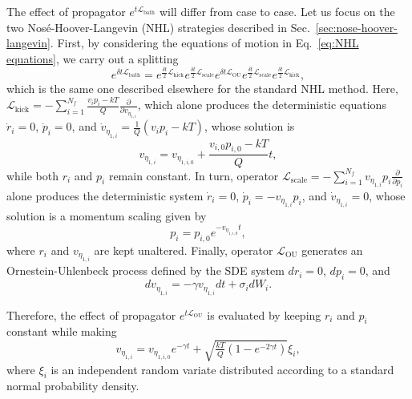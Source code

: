 \documentclass[
aip,
jcp,
reprint,
]{revtex4-1}
\newcommand{\diff}[2]{\frac{\partial #2}{\partial #1}} %
\newcommand{\Liu}{\mathcal{L}}
\begin{document}
The effect of propagator $e^{t \Liu_\mathrm{bath}}$ will differ from case to case.
Let us focus on the two Nos\'{e}-Hoover-Langevin (NHL) strategies described in Sec.~\ref{sec:nose-hoover-langevin}.
First, by considering the equations of motion in Eq.~\eqref{eq:NHL equations}, we carry out a splitting
\begin{equation*}
e^{\delta t \Liu_\mathrm{bath}} = e^{\frac{\delta t}{2} \mathcal{L}_\mathrm{kick}} e^{\frac{\delta t}{2} \mathcal{L}_\mathrm{scale}} e^{\delta t \mathcal{L}_\mathrm{OU}} e^{\frac{\delta t}{2} \mathcal{L}_\mathrm{scale}} e^{\frac{\delta t}{2} \mathcal{L}_\mathrm{kick}},
\end{equation*}
which is the same one described elsewhere \cite{Leimkuhler_2015} for the standard NHL method.
Here, $\mathcal{L}_\mathrm{kick} = - \sum_{i=1}^{N_f} \frac{v_i p_i - kT}{Q} \diff{v_{\eta_{1,i}}}{}$, which alone produces the deterministic equations $\dot{r}_i = 0$, $\dot{p}_i = 0$, and $\dot{v}_{\eta_{1,i}} = \frac{1}{Q}(v_i p_i - kT)$, whose solution is
\begin{equation*}
v_{\eta_{1,i}} = v_{\eta_{1,i,0}} + \frac{v_{i,0} p_{i,0} - kT}{Q} t,
\end{equation*}
while both $r_i$ and $p_i$ remain constant.
In turn, operator $\mathcal{L}_\mathrm{scale} = - \sum_{i=1}^{N_f} v_{\eta_{1,i}} p_i \diff{p_i}{}$ alone produces the deterministic system $\dot{r}_i = 0$, $\dot{p}_i = - v_{\eta_{1,i}} p_i$, and $\dot{v}_{\eta_{1,i}} = 0$, whose solution is a momentum scaling given by
\begin{equation*}
p_i = p_{i,0} e^{-v_{\eta_{1,i,0}} t},
\end{equation*}
where $r_i$ and $v_{\eta_{1,i}}$ are kept unaltered.
Finally, operator $\mathcal{L}_\mathrm{OU}$ generates an Ornestein-Uhlenbeck process defined by the SDE system $dr_i = 0$, $dp_i = 0$, and
\begin{equation*}
dv_{\eta_{1, i}} = - \gamma v_{\eta_{1, i}}dt + \sigma_i dW_i.
\end{equation*}

Therefore, the effect of propagator $e^{t \mathcal{L}_\mathrm{OU}}$ is evaluated by keeping $r_i$ and $p_i$ constant while making
\begin{equation*}
v_{\eta_{1, i}} = v_{\eta_{1,i,0}} e^{-\gamma t} + \sqrt{\tfrac{kT}{Q}(1 - e^{-2\gamma t})} \xi_i,
\end{equation*}
where $\xi_i$ is an independent random variate distributed according to a standard normal probability density.
\end{document}
